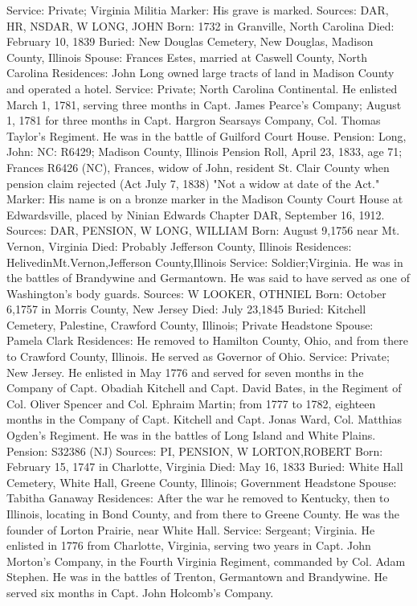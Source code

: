 Service: Private; Virginia Militia 
Marker: His grave is marked. 
Sources: DAR, HR, NSDAR, W 
LONG, JOHN
Born: 1732 in Granville, North Carolina
Died: February 10, 1839
Buried: New Douglas Cemetery, New Douglas, Madison County, Illinois
Spouse: Frances Estes, married at Caswell County, North Carolina Residences: John Long owned large tracts of land in Madison County and oper­ated a hotel.
Service: Private; North Carolina Continental. He enlisted March 1, 1781, serving three months in Capt. James Pearce's Company; August 1, 1781 for three months in Capt. Hargron Searsays Company, Col. Thomas Taylor's Regi­ment. He was in the battle of Guilford Court House.
Pension: Long, John: NC: R6429; Madison County, Illinois Pension Roll, April 23, 1833, age 71; Frances R6426 (NC), Frances, widow of John, resident St. Clair County when pension claim rejected (Act July 7, 1838) "Not a widow at date of the Act."
Marker: His name is on a bronze marker in the Madison County Court House at Edwardsville, placed by Ninian Edwards Chapter DAR, September 16, 1912.
Sources: DAR, PENSION, W 
LONG, WILLIAM 
Born: August 9,1756 near Mt. Vernon, Virginia
Died: Probably Jefferson County, Illinois Residences: HelivedinMt.Vernon,Jefferson County,Illinois
Service: Soldier;Virginia. He was in the battles of Brandywine and Germantown. He was said to have served as one of Washington's body guards.
Sources: W 
LOOKER, OTHNIEL 
Born: October 6,1757 in Morris County, New Jersey 
Died: July 23,1845 
Buried: Kitchell Cemetery, Palestine, Crawford County, Illinois; Private Head­stone 
Spouse: Pamela Clark Residences: He removed to Hamilton County, Ohio, and from there to Crawford County, Illinois. He served as Governor of Ohio. 
Service: Private; New Jersey. He enlisted in May 1776 and served for seven months in the Company of Capt. Obadiah Kitchell and Capt. David Bates, in the Regiment of Col. Oliver Spencer and Col. Ephraim Martin; from 1777 to 1782, eighteen months in the Company of Capt. Kitchell and Capt. Jonas Ward, Col. Matthias Ogden's Regiment. He was in the battles of Long Island and White Plains. 
Pension: S32386 (NJ) 
Sources: PI, PENSION, W 
LORTON,ROBERT
Born: February 15, 1747 in Charlotte, Virginia
Died: May 16, 1833
Buried: White Hall Cemetery, White Hall, Greene County, Illinois; Government Headstone 
Spouse: Tabitha Ganaway Residences: After the war he removed to Kentucky, then to Illinois, locating in Bond County, and from there to Greene County. He was the founder of Lorton Prairie, near White Hall. 
Service: Sergeant; Virginia. He enlisted in 1776 from Charlotte, Virginia, serving two years in Capt. John Morton's Company, in the Fourth Virginia Regi­ment, commanded by Col. Adam Stephen. He was in the battles of Trenton, Germantown and Brandywine. He served six months in Capt. John Holcomb's Company. 
